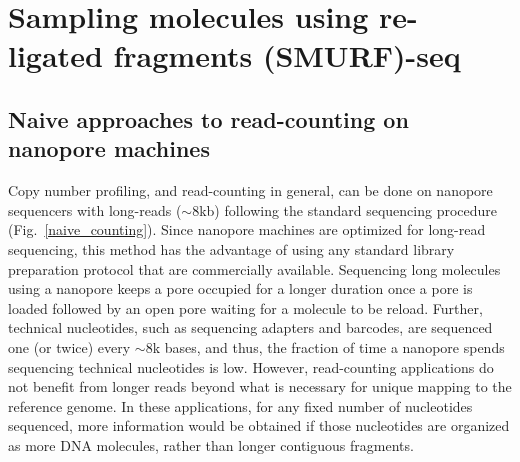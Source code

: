 \chapter{Sampling molecules using re-ligated fragments (SMURF)-seq}
\label{ch3}


\section{Naive approaches to read-counting on nanopore machines}
Copy number profiling, and read-counting in general, can be done on
nanopore sequencers with long-reads ($\sim$8kb) following the standard
sequencing procedure (Fig.~\ref{naive_counting}).
Since nanopore machines are optimized for long-read sequencing, this
method has the advantage of using any standard library preparation
protocol that are commercially available.  Sequencing long
molecules using a nanopore keeps a pore occupied for a longer duration
once a pore is loaded followed by an open pore waiting for a molecule to
be reload.  Further, technical nucleotides, such as sequencing adapters
and barcodes, are sequenced one (or twice) every $\sim$8k bases, and
thus, the fraction of time a nanopore spends sequencing technical
nucleotides is low.
However, read-counting applications do not benefit from longer reads
beyond what is necessary for unique mapping to the reference genome. In
these applications, for any fixed number of nucleotides sequenced, more
information would be obtained if those nucleotides are organized as more
DNA molecules, rather than longer contiguous fragments.


